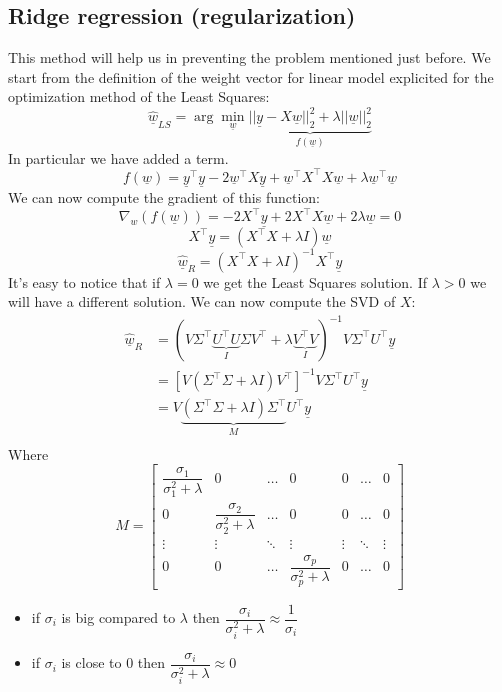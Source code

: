 \subsection{Ridge regression (regularization)}
This method will help us in preventing the problem mentioned just before. We start from the definition of the weight vector for linear model explicited for the optimization method of the Least Squares:
\[
    \underline{\hat{w}}_{LS} = \arg \min_{\underline{w}} \underbrace{||\underline{y} - X\underline{w}||_2^2 + \lambda ||\underline{w}||_2^2}_{f(\underline{w})}
\]
In particular we have added a term. 
\[
    f(\underline{w}) = \underline{y}^\intercal \underline{y} - 2\underline{w}^\intercal X \underline{y} + \underline{w}^\intercal X^\intercal X \underline{w} + \lambda \underline{w}^\intercal \underline{w}
\]
We can now compute the gradient of this function:
\[
        \nabla_w(f(\underline{w})) = -2X^\intercal \underline{y} + 2X^\intercal X \underline{w} + 2\lambda \underline{w} = 0      
\]
\[
    X^\intercal \underline{y} = (X^\intercal X + \lambda I)\underline{w}     
\]
\[
    \underline{\hat{w}}_{R} = (X^\intercal X + \lambda I)^{-1} X^\intercal \underline{y}    
\]
It's easy to notice that if $\lambda = 0$ we get the Least Squares solution. If $\lambda > 0$ we will have a different solution. We can now compute the SVD of $X$:
\[
    \begin{split}
        \underline{\hat{w}}_R &= (V\Sigma^\intercal \underbrace{U^\intercal U}_{I} \Sigma V^\intercal + \lambda \underbrace{V^\intercal V}_{I})^{-1} V\Sigma^\intercal U^\intercal \underline{y} \\
        &= \left[V(\Sigma^\intercal \Sigma + \lambda I)V^\intercal\right]^{-1} V\Sigma^\intercal U^\intercal \underline{y} \\
        &= V\underbrace{(\Sigma^\intercal \Sigma + \lambda I) \Sigma^\intercal}_{M}U^\intercal \underline{y} \\
    \end{split}    
\]
Where 
\[
M = \begin{bmatrix}
    \dfrac{\sigma_1}{\sigma_1^2 + \lambda} & 0 & \dots & 0 & 0 & \dots & 0\\
    0 & \dfrac{\sigma_2}{\sigma_2^2 + \lambda} & \dots & 0 & 0 & \dots & 0\\
    \vdots & \vdots & \ddots & \vdots & \vdots & \ddots & \vdots\\
    0 & 0 & \dots & \dfrac{\sigma_p}{\sigma_p^2 + \lambda} & 0 & \dots & 0
\end{bmatrix}
\]
\begin{itemize}
    \item if $\sigma_i$ is big compared to $\lambda$ then $\dfrac{\sigma_i}{\sigma_i^2 + \lambda} \approx \dfrac{1}{\sigma_i}$
    \item if $\sigma_i$ is close to 0 then $\dfrac{\sigma_i}{\sigma_i^2 + \lambda} \approx 0$
\end{itemize}
